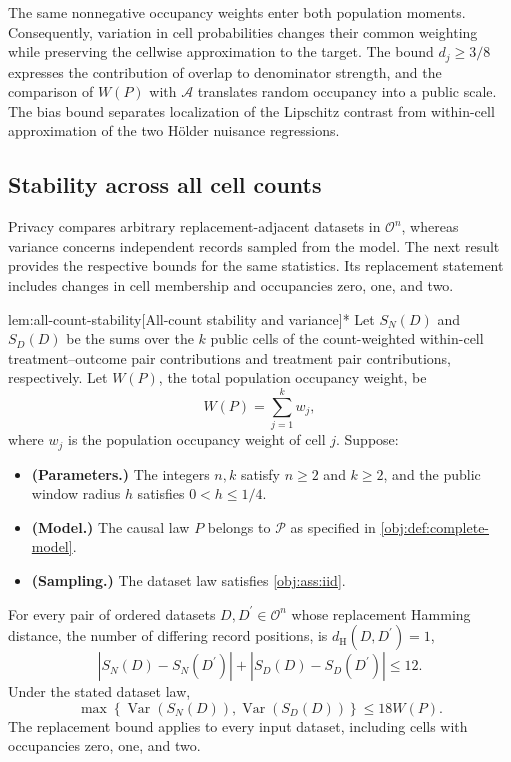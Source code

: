 \documentclass[11pt]{article}
\begin{document}
The same nonnegative occupancy weights enter both population moments. Consequently, variation in cell probabilities changes their common weighting while preserving the cellwise approximation to the target. The bound \(d_j\ge3/8\) expresses the contribution of overlap to denominator strength, and the comparison of \(W(P)\) with \(\mathcal A\) translates random occupancy into a public scale. The bias bound separates localization of the Lipschitz contrast from within-cell approximation of the two Hölder nuisance regressions.

\subsection{Stability across all cell counts}

Privacy compares arbitrary replacement-adjacent datasets in \(\mathcal O^n\), whereas variance concerns independent records sampled from the model. The next result provides the respective bounds for the same statistics. Its replacement statement includes changes in cell membership and occupancies zero, one, and two.

\begin{lemmav}{lem:all-count-stability}[All-count stability and variance]*
Let \(S_N(D)\) and \(S_D(D)\) be the sums over the \(k\) public cells of the count-weighted within-cell treatment–outcome pair contributions and treatment pair contributions, respectively. Let \(W(P)\), the total population occupancy weight, be
\[
W(P)=\sum_{j=1}^{k}w_j,
\]
where \(w_j\) is the population occupancy weight of cell \(j\). Suppose:
\begin{itemize}
\item \textbf{(Parameters.)} The integers \(n,k\) satisfy \(n\ge2\) and \(k\ge2\), and the public window radius \(h\) satisfies \(0<h\le1/4\).
\item \textbf{(Model.)} The causal law \(P\) belongs to \(\mathcal P\) as specified in \cref{obj:def:complete-model}.
\item \textbf{(Sampling.)} The dataset law satisfies \cref{obj:ass:iid}.
\end{itemize}
For every pair of ordered datasets \(D,D^{\prime}\in\mathcal O^n\) whose replacement Hamming distance, the number of differing record positions, is \(d_{\mathrm H}(D,D^{\prime})=1\),
\[
\left|S_N(D)-S_N(D^{\prime})\right|
+\left|S_D(D)-S_D(D^{\prime})\right|
\le12.
\]
Under the stated dataset law,
\[
\max\left\{
\operatorname{Var}(S_N(D)),
\operatorname{Var}(S_D(D))
\right\}
\le18W(P).
\]
The replacement bound applies to every input dataset, including cells with occupancies zero, one, and two.
\end{lemmav}
\end{document}
